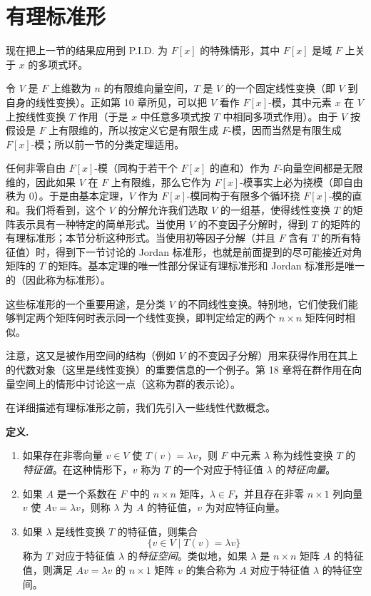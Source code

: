 \section{有理标准形}

现在把上一节的结果应用到 P.I.D. 为 $F[x]$ 的特殊情形，其中 $F[x]$ 是域 $F$ 上关于 $x$ 的多项式环。

令 $V$ 是 $F$ 上维数为 $n$ 的有限维向量空间，$T$ 是 $V$ 的一个固定线性变换（即 $V$ 到自身的线性变换）。正如第 10 章所见，可以把 $V$ 看作 $F[x]$-模，其中元素 $x$ 在 $V$ 上按线性变换 $T$ 作用（于是 $x$ 中任意多项式按 $T$ 中相同多项式作用）。由于 $V$ 按假设是 $F$ 上有限维的，所以按定义它是有限生成 $F$-模，因而当然是有限生成 $F[x]$-模；所以前一节的分类定理适用。

任何非零自由 $F[x]$-模（同构于若干个 $F[x]$ 的直和）作为 $F$-向量空间都是无限维的，因此如果 $V$ 在 $F$ 上有限维，那么它作为 $F[x]$-模事实上必为挠模（即自由秩为 $0$）。于是由基本定理，$V$ 作为 $F[x]$-模同构于有限多个循环挠 $F[x]$-模的直和。我们将看到，这个 $V$ 的分解允许我们选取 $V$ 的一组基，使得线性变换 $T$ 的矩阵表示具有一种特定的简单形式。当使用 $V$ 的不变因子分解时，得到 $T$ 的矩阵的有理标准形；本节分析这种形式。当使用初等因子分解（并且 $F$ 含有 $T$ 的所有特征值）时，得到下一节讨论的 Jordan 标准形，也就是前面提到的尽可能接近对角矩阵的 $T$ 的矩阵。基本定理的唯一性部分保证有理标准形和 Jordan 标准形是唯一的（因此称为标准形）。

这些标准形的一个重要用途，是分类 $V$ 的不同线性变换。特别地，它们使我们能够判定两个矩阵何时表示同一个线性变换，即判定给定的两个 $n\times n$ 矩阵何时相似。

注意，这又是被作用空间的结构（例如 $V$ 的不变因子分解）用来获得作用在其上的代数对象（这里是线性变换）的重要信息的一个例子。第 18 章将在群作用在向量空间上的情形中讨论这一点（这称为群的表示论）。

在详细描述有理标准形之前，我们先引入一些线性代数概念。

\noindent\textbf{定义.}
\begin{enumerate}[label=(\arabic*)]
\item 如果存在非零向量 $v\in V$ 使 $T(v)=\lambda v$，则 $F$ 中元素 $\lambda$ 称为线性变换 $T$ 的\emph{特征值}。在这种情形下，$v$ 称为 $T$ 的一个对应于特征值 $\lambda$ 的\emph{特征向量}。
\item 如果 $A$ 是一个系数在 $F$ 中的 $n\times n$ 矩阵，$\lambda\in F$，并且存在非零 $n\times1$ 列向量 $v$ 使 $Av=\lambda v$，则称 $\lambda$ 为 $A$ 的特征值，$v$ 为对应特征向量。
\item 如果 $\lambda$ 是线性变换 $T$ 的特征值，则集合
\[
\{v\in V\mid T(v)=\lambda v\}
\]
称为 $T$ 对应于特征值 $\lambda$ 的\emph{特征空间}。类似地，如果 $\lambda$ 是 $n\times n$ 矩阵 $A$ 的特征值，则满足 $Av=\lambda v$ 的 $n\times1$ 矩阵 $v$ 的集合称为 $A$ 对应于特征值 $\lambda$ 的特征空间。
\end{enumerate}

